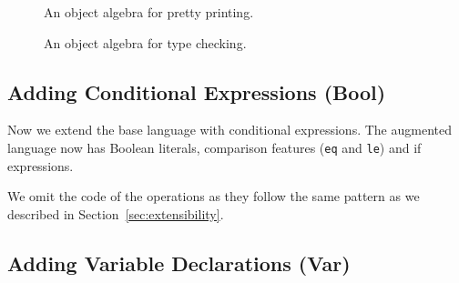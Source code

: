 \begin{figure}[t]
  \centering
  \caption{An object algebra for pretty printing. }
  \label{fig:printer}
\end{figure}

\begin{figure}[t]
  \centering
  \caption{An object algebra for type checking. }
  \label{fig:checker}
\end{figure}


\subsection{Adding Conditional Expressions (Bool)}

Now we extend the base language with conditional expressions.
The augmented language now has Boolean literals, comparison features
(\lstinline{eq} and \lstinline{le}) and if expressions.

We omit the code of the operations as they follow the same pattern as we
described in Section~\ref{sec:extensibility}.





\subsection{Adding Variable Declarations (Var)}

